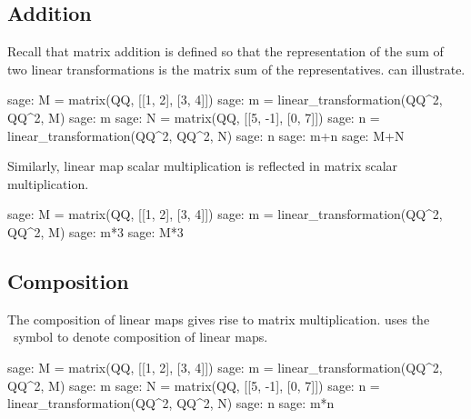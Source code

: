 \subsection{Addition}
Recall that matrix addition is defined so that the representation of
the sum of two linear transformations is the matrix sum of the representatives.
\Sage{} can illustrate.
\begin{sagecommandline}
sage: M = matrix(QQ, [[1, 2], [3, 4]])
sage: m = linear_transformation(QQ^2, QQ^2, M)
sage: m
sage: N = matrix(QQ, [[5, -1], [0, 7]])
sage: n = linear_transformation(QQ^2, QQ^2, N)
sage: n
sage: m+n
sage: M+N
\end{sagecommandline}
\noindent Similarly, linear map scalar multiplication is reflected in 
matrix scalar multiplication.
\begin{sagecommandline}
sage: M = matrix(QQ, [[1, 2], [3, 4]])
sage: m = linear_transformation(QQ^2, QQ^2, M)
sage: m*3
sage: M*3  
\end{sagecommandline}



\subsection{Composition}
The composition of linear maps gives rise to matrix multiplication.
\Sage{} uses the \inlinecode{*}~symbol to denote composition of linear maps.
\begin{sagecommandline}
sage: M = matrix(QQ, [[1, 2], [3, 4]])
sage: m = linear_transformation(QQ^2, QQ^2, M)
sage: m
sage: N = matrix(QQ, [[5, -1], [0, 7]])
sage: n = linear_transformation(QQ^2, QQ^2, N)
sage: n
sage: m*n
\end{sagecommandline}

